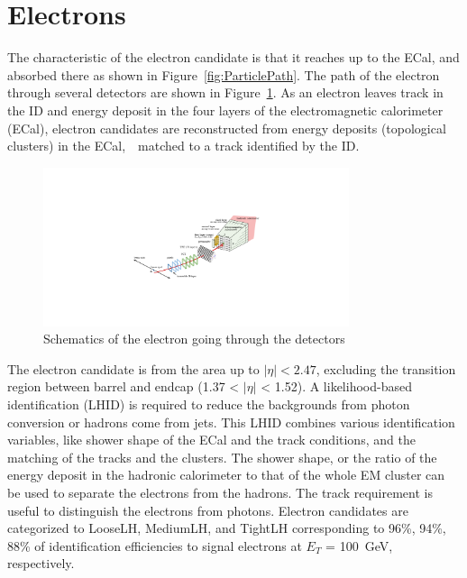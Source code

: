 \section{Electrons}
The characteristic of the electron candidate is that it reaches up to the ECal, and absorbed there as shown in Figure~\ref{fig:ParticlePath}. The path of the electron through several detectors are shown in Figure~\ref{fig:electronPath}. As an electron leaves track in the ID and energy deposit in the four layers of the electromagnetic calorimeter (ECal), electron candidates are reconstructed from energy deposits (topological clusters) in the ECal,　matched to a track identified by the ID.
\begin{figure}[tbp]
\begin{center}
 \includegraphics[width=0.80\textwidth,keepaspectratio]{figures/Reconstruction/electronPath}
\caption{
Schematics of the electron going through the detectors
}
\label{fig:electronPath}
\end{center}
\end{figure}

The electron candidate is from the area up to $|\eta|<2.47$, excluding the transition region between barrel and endcap (1.37 < $|\eta|$ < 1.52).
A likelihood-based identification (LHID) is required to reduce the backgrounds from photon conversion or hadrons come from jets. 
This LHID combines various identification variables, like shower shape of the ECal and the track conditions, and the matching of the tracks and the clusters.
The shower shape, or the ratio of the energy deposit in the hadronic calorimeter to that of the whole EM cluster can be used to separate the electrons from the hadrons. The track requirement is useful to distinguish the electrons from photons.
Electron candidates are categorized to LooseLH, MediumLH, and TightLH corresponding to 96\%, 94\%, 88\% of identification efficiencies to signal electrons at $E_T$ = 100~GeV, respectively.

